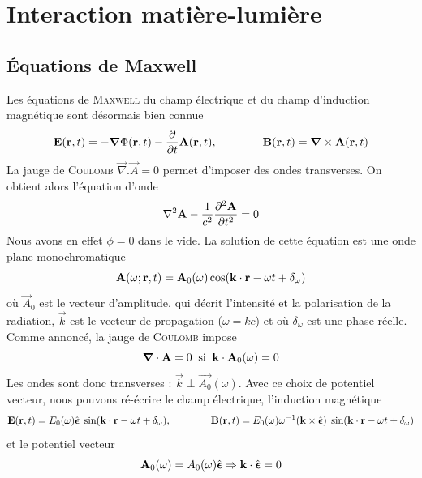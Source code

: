 \chapter{Interaction matière-lumière}
\section{Équations de Maxwell}
Les équations de \textsc{Maxwell} du champ électrique et du champ d'induction magnétique sont 
désormais bien connue
\begin{equation}
{\bf E} ({\bf r},t) = - \mbox{\boldmath $ \nabla $} \Phi({\bf r},t) - 
  \frac{\partial }{\partial t} {\bf A} ({\bf r},t),\qquad\qquad
  {\bf B} ({\bf r},t) = \mbox{\boldmath $ \nabla $} \times {\bf A} ({\bf r},t)
\end{equation}
La jauge de \textsc{Coulomb} $\vec\nabla.\vec{A}=0$ permet d'imposer des ondes transverses. On obtient
alors l'équation d'onde
\begin{equation}
\nabla ^2 {\bf A} - \frac{1}{c^2} \frac{\partial ^2 {\bf A}}{\partial t ^2} = 0 
\end{equation}
Nous avons en effet $\phi=0$ dans le vide. La solution de cette équation est une onde plane
monochromatique
\begin{equation}
{\bf A}(\omega; {\bf r},t) = {\bf A}_0(\omega) 
   \cos ( {\bf k} \cdot {\bf r} - \omega t  
 + \delta_{\omega} ) 
\end{equation}
où $\vec A_0$ est le vecteur d'amplitude, qui décrit l'intensité et la polarisation de la radiation, $\vec{k}$ est le vecteur de 
propagation ($\omega=kc$) et où $\delta_\omega$ est une phase réelle. Comme annoncé, la jauge de
\textsc{Coulomb} impose
\begin{equation}
\mbox{\boldmath $ \nabla $} \cdot {\bf A} = 0  \; \; \mbox{si} \; \; 
   {\bf k} \cdot {\bf A}_0(\omega) = 0 
\end{equation}
Les ondes sont donc transverses : $\vec{k}\perp\vec{A_0}(\omega)$. Avec ce choix de potentiel vecteur,
nous pouvons ré-écrire le champ électrique, l'induction magnétique 
\begin{equation}
{\bf E} ({\bf r},t)  = E_0(\omega)
\hat{ \mbox{\boldmath $ \epsilon $} } 
  \; \sin ( {\bf k} \cdot {\bf r} - \omega t + \delta_{\omega}),\qquad\qquad
  {\bf B} ({\bf r},t) = E_0(\omega)
\omega^{-1}
 ({\bf k} \times \hat{ \mbox{\boldmath $ \epsilon $}} )
\; \sin ( {\bf k} \cdot {\bf r} - \omega t + \delta_{\omega})
\end{equation}
et le potentiel vecteur
\begin{equation}
 {\bf A}_0(\omega) = A_0(\omega) 
\hat{  \mbox{\boldmath $ \epsilon $}}
\Rightarrow   {\bf k} \cdot 
\hat{  \mbox{\boldmath $ \epsilon $}} = 0
\end{equation}
